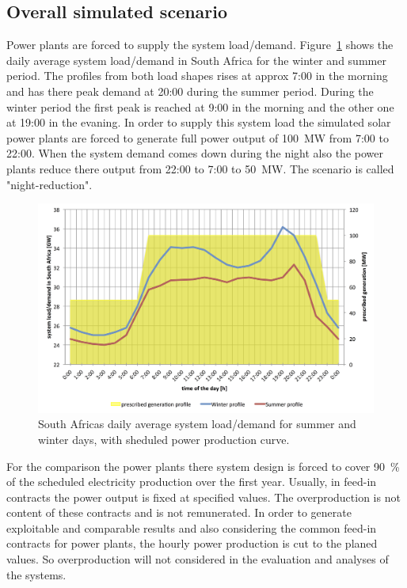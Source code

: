 \documentclass[Master,MEE,english]{twbook}%
\begin{document}
\subsection{Overall simulated scenario} \label{Overall simulated configuration}
Power plants are forced to supply the system load/demand. Figure~\ref{LoadScenarios} shows the daily average system load/demand in South Africa for the winter and summer period. The profiles from both load shapes rises at approx 7:00 in the morning and has there peak demand at 20:00 during the summer period. During the winter period the first peak is reached at 9:00 in the morning and the other one at 19:00 in the evaning. In order to supply this system load the simulated solar power plants are forced to generate full power output of 100~MW from 7:00 to 22:00. When the system demand comes down during the night also the power plants reduce there output from 22:00 to 7:00 to 50~MW. The scenario is called "night-reduction".
\begin{figure}[htbp]  
\centering
\includegraphics[width=1\linewidth]{FIG/LoadScenarios}
\caption[South Africas daily average system load/demand for summer and winter days, with sheduled power production curve.]{South Africas daily average system load/demand for summer and winter days, with sheduled power production curve.}\label{LoadScenarios}
\end{figure}
For the comparison the power plants there system design is forced to cover 90~\% of the scheduled electricity production over the first year.  Usually, in feed-in contracts the power output is fixed at specified values. The overproduction is not content of these contracts and is not remunerated. In order to generate exploitable and comparable results and also considering the common feed-in contracts for power plants, the hourly power production is cut to the planed values. So overproduction will not considered in the evaluation and analyses of the systems.\\
\end{document}
